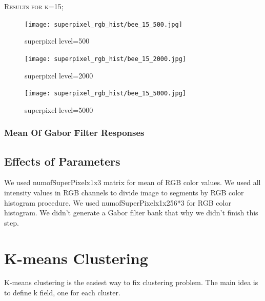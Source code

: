 \documentclass[12pt]{article}
\begin{document}
\begin{minipage}{\linewidth}
\centering
	\textsc{\large Results for k=15;}\\[0.1 cm]  
	\begin{minipage}{0.45\linewidth}
		\begin{figure} [H]
			\centering
			 \texttt{[image: superpixel\_rgb\_hist/bee\_15\_500.jpg]}
	 		\caption{superpixel level=500}
		\end{figure}
	\end{minipage}
	\hspace{0.05\linewidth}
	\begin{minipage}{0.45\linewidth}
			\begin{figure} [H]
				\centering
				 \texttt{[image: superpixel\_rgb\_hist/bee\_15\_2000.jpg]}
	 			\caption{superpixel level=2000}
			\end{figure}
	\end{minipage}
	\hspace{0.05\linewidth}
	\begin{minipage}{0.45\linewidth}
		\begin{figure} [H]
			\centering
			 \texttt{[image: superpixel\_rgb\_hist/bee\_15\_5000.jpg]}
	 		\caption{superpixel level=5000}
		\end{figure}
	\end{minipage}
\end{minipage}
\subsubsection*{Mean Of Gabor Filter Responses}


\subsection{Effects of Parameters}
We used numofSuperPixelx1x3 matrix for mean of RGB color values. We used all intensity values in RGB channels to divide image to segments by RGB color histogram procedure. We used numofSuperPixelx1x256*3 for RGB color histogram. We didn't generate a Gabor filter bank that why we didn't finish this step.




\section{K-means Clustering}
K-means clustering is the easiest way to fix clustering problem. The main idea is to define k field, one for each cluster. 
\end{document}
